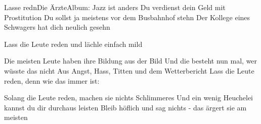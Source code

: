 \begin{song}{Lasse redn}{Die Ärzte}{Album: Jazz ist anders}
Du verdienst dein Geld mit Prostitution
Du sollst ja meistens vor dem Busbahnhof stehn
Der Kollege eines Schwagers hat dich neulich gesehn

Lass die Leute reden und lächle einfach mild

Die meisten Leute haben ihre Bildung aus der Bild
Und die besteht nun mal, wer wüsste das nicht
Aus Angst, Hass, Titten und dem Wetterbericht
Lass die Leute reden, denn wie das immer ist:

Solang die Leute reden, machen sie nichts Schlimmeres
Und ein wenig Heuchelei kannst du dir durchaus leisten
Bleib höflich und sag nichts - das ärgert sie am meisten

\end{song}
